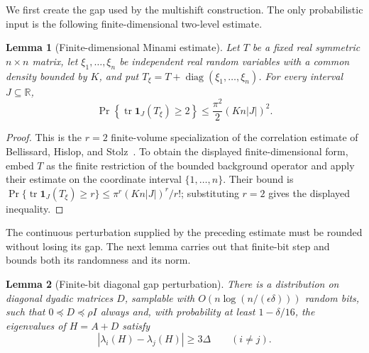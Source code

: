 \documentclass[11pt]{article}
\newtheorem{lemma}{Lemma}[section]
\begin{document}
We first create the gap used by the multishift construction.  The only
probabilistic input is the following finite-dimensional two-level estimate.

\begin{lemma}[Finite-dimensional Minami estimate]
\label{lem:minami-specialized}
Let $T$ be a fixed real symmetric $n\times n$ matrix, let
$\xi_1,\ldots,\xi_n$ be independent real random variables with a common
density bounded by $K$, and put
$T_\xi=T+\operatorname{diag}(\xi_1,\ldots,\xi_n)$.  For every interval
$J\subseteq\mathbb R$,
\[
 \Pr\!\left\{\operatorname{tr}\mathbf 1_J(T_\xi)\geq2\right\}
 \leq\frac{\pi^2}{2}(Kn|J|)^2.
\]
\end{lemma}

\begin{proof}
This is the $r=2$ finite-volume specialization of the correlation estimate
of Bellissard, Hislop, and Stolz~\cite[Theorem~4]{bellissardHislopStolz2007CorrelationEstimates}.
To obtain the displayed finite-dimensional form, embed $T$ as the finite
restriction of the bounded background operator and apply their estimate on
the coordinate interval $\{1,\ldots,n\}$.  Their bound is
$\Pr\{\operatorname{tr}\mathbf 1_J(T_\xi)\geq r\}
\leq\pi^r(Kn|J|)^r/r!$; substituting $r=2$ gives the displayed inequality.
\end{proof}

The continuous perturbation supplied by the preceding estimate must be
rounded without losing its gap.  The next lemma carries out that finite-bit
step and bounds both its randomness and its norm.

\begin{lemma}[Finite-bit diagonal gap perturbation]
\label{lem:random-gap}
There is a distribution on diagonal dyadic matrices $D$, samplable with
$O(n\log(n/(\epsilon\delta)))$ random bits, such that
$0\preceq D\preceq\rho I$ always and, with probability at least
$1-\delta/16$, the eigenvalues of $H=A+D$ satisfy
\[
 |\lambda_i(H)-\lambda_j(H)|\geq3\Delta
 \qquad(i\ne j).
\]
\end{lemma}
\end{document}
